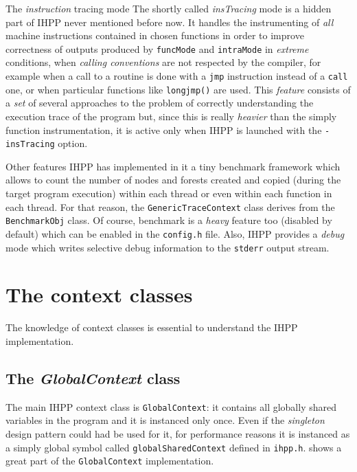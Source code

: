 \documentclass[a4paper,10pt]{report}
\begin{document}
\begin{paragraph}{The \emph{instruction} tracing mode}
The shortly called \emph{insTracing} mode is a hidden part of IHPP never
mentioned before now. It handles the instrumenting of \emph{all} machine instructions
contained in chosen functions in order to improve correctness
of outputs produced by \verb|funcMode| and \verb|intraMode|
in \emph{extreme} conditions, when \emph{calling conventions} are not
respected by the compiler, for example when a call to a routine is done
with a \verb|jmp| instruction
instead of a \verb|call| one, or when particular functions like \verb|longjmp()| are used.
This \emph{feature} consists of a \emph{set} of several approaches to the problem
of correctly understanding the execution trace of the program but,
since this is really \emph{heavier} than the simply function instrumentation,
it is active only when IHPP is launched with the \verb|-insTracing| option.
\end{paragraph}

\begin{paragraph}{Other features}
IHPP has implemented in it a tiny benchmark framework which allows
to count the number of nodes and forests created and copied (during the
target program execution) within each
thread or even within each function in each thread. For that reason,
the \verb|GenericTraceContext| class derives from the \verb|BenchmarkObj| class.
Of course, benchmark is a \emph{heavy} feature too (disabled by default) which can be enabled
in the \verb|config.h| file.
Also, IHPP provides a \emph{debug} mode
which writes selective debug information to the \verb|stderr| output stream.
\end{paragraph}

\section{The context classes}

The knowledge of context classes is essential to understand the IHPP implementation.

\subsection{The \emph{GlobalContext} class}
The main IHPP context class is \verb|GlobalContext|: it contains all globally shared variables in the program and it is instanced only once.
Even if the \emph{singleton} design pattern could had be used for it, for
performance reasons it is instanced as a simply global symbol called \verb|globalSharedContext| defined in \verb|ihpp.h|.
 shows a great part of the \verb|GlobalContext| implementation.
\end{document}
